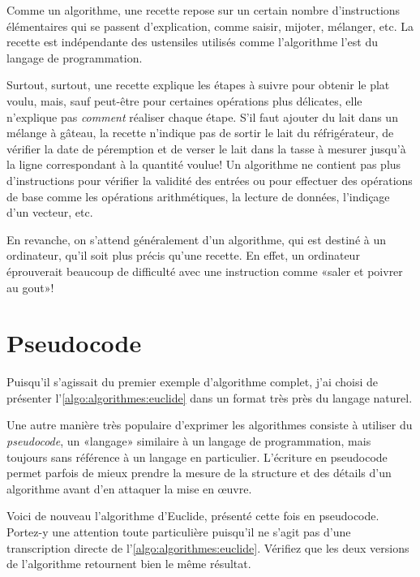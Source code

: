 Comme un algorithme, une recette repose sur un certain nombre
d'instructions élémentaires qui se passent d'explication, comme
saisir, mijoter, mélanger, etc. La recette est indépendante des
ustensiles utilisés comme l'algorithme l'est du langage de
programmation.

Surtout, surtout, une recette explique les étapes à suivre pour
obtenir le plat voulu, mais, sauf peut-être pour certaines opérations
plus délicates, elle n'explique pas \emph{comment} réaliser chaque
étape. S'il faut ajouter du lait dans un mélange à gâteau, la recette
n'indique pas de sortir le lait du réfrigérateur, de vérifier la date
de péremption et de verser le lait dans la tasse à mesurer jusqu'à la
ligne correspondant à la quantité voulue! Un algorithme ne contient pas
plus d'instructions pour vérifier la validité des entrées ou pour
effectuer des opérations de base comme les opérations arithmétiques,
la lecture de données, l'indiçage d'un vecteur, etc.

En revanche, on s'attend généralement d'un algorithme, qui est destiné
à un ordinateur, qu'il soit plus précis qu'une recette. En effet, un
ordinateur éprouverait beaucoup de difficulté avec une instruction
comme «saler et poivrer au gout»!



\section{Pseudocode}
\label{sec:algorithmes:pseudocode}

Puisqu'il s'agissait du premier exemple d'algorithme complet, j'ai
choisi de présenter l'\autoref{algo:algorithmes:euclide} dans un
format très près du langage naturel.

Une autre manière très populaire d'exprimer les algorithmes consiste à
utiliser du \emph{pseudocode}, un «langage»
similaire à un langage de programmation, mais toujours sans référence
à un langage en particulier. L'écriture en pseudocode permet parfois
de mieux prendre la mesure de la structure et des détails d'un
algorithme avant d'en attaquer la mise en œuvre.

Voici de nouveau l'algorithme
d'Euclide, présenté cette fois en pseudocode. Portez-y une attention
toute particulière puisqu'il ne s'agit pas d'une transcription directe
de l'\autoref{algo:algorithmes:euclide}. Vérifiez que les deux
versions de l'algorithme retournent bien le même résultat.

